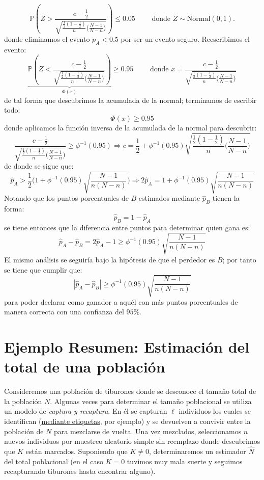 \documentclass[
]{book}
\begin{document}
\[
\mathbb{P}\left( Z > \dfrac{c - \frac{1}{2}}{\sqrt{\frac{\frac{1}{2}(1-\frac{1}{2})}{n}\Big( \frac{N-1}{N-n}\Big)}} \right) \leq 0.05 \qquad \text{ donde } Z \sim \text{Normal}(0,1).
\]
donde eliminamos el evento \(p_A < 0.5\) por ser un evento seguro. Reescribimos el evento:
\[
\underbrace{\mathbb{P}\left( Z < \dfrac{c - \frac{1}{2}}{\sqrt{\frac{\frac{1}{2}(1-\frac{1}{2})}{n}\Big( \frac{N-1}{N-n}\Big)}} \right)}_{\Phi(x)} \geq 0.95 \qquad \text{ donde } x = \dfrac{c - \frac{1}{2}}{\sqrt{\frac{\frac{1}{2}(1-\frac{1}{2})}{n}\Big( \frac{N-1}{N-n}\Big)}}
\]
de tal forma que descubrimos la acumulada de la normal; terminamos de escribir todo:
\[
\Phi(x) \geq 0.95
\]
donde aplicamos la función inversa de la acumulada de la normal para descubrir:
\[
\dfrac{c - \frac{1}{2}}{\sqrt{\frac{\frac{1}{2}(1-\frac{1}{2})}{n}\Big( \frac{N-1}{N-n}\Big)}} \geq \phi^{-1}(0.95) \Rightarrow c = \frac{1}{2} + \phi^{-1}(0.95)\sqrt{\frac{\frac{1}{2}(1-\frac{1}{2})}{n}\Big( \frac{N-1}{N-n}\Big)}
\]
de donde se sigue que:
\[
\hat{p}_{A} > \frac{1}{2}\Bigg(1 + \phi^{-1}(0.95)\sqrt{\frac{N-1}{n(N-n)}} \Bigg) \Rightarrow 2\hat{p}_A = 1 + \phi^{-1}(0.95)\sqrt{\frac{N-1}{n(N-n)}} 
\]
Notando que los puntos porcentuales de \(B\) estimados mediante \(\hat{p}_B\) tienen la forma:
\[
\hat{p}_B = 1 - \hat{p}_A
\]
se tiene entonces que la diferencia entre puntos para determinar quien gana es:
\[
\hat{p}_A - \hat{p}_B = 2\hat{p}_A - 1 \geq \phi^{-1}(0.95)\sqrt{\frac{N-1}{n(N-n)}} 
\]
El mismo análisis se seguiría bajo la hipótesis de que el perdedor es \(B\); por tanto se tiene que cumplir que:
\[
| \hat{p}_A - \hat{p}_B | \geq \phi^{-1}(0.95)\sqrt{\frac{N-1}{n(N-n)}} 
\]
para poder declarar como ganador a aquél con más puntos porcentuales de manera correcta con una confianza del \(95\%\).

\hypertarget{ejemplo-resumen-estimaciuxf3n-del-total-de-una-poblaciuxf3n}{%
\section{Ejemplo Resumen: Estimación del total de una población}\label{ejemplo-resumen-estimaciuxf3n-del-total-de-una-poblaciuxf3n}}

Consideremos una población de tiburones donde se desconoce el tamaño total de la población \(N\). Algunas veces para determinar el tamaño poblacional se utiliza un modelo de \emph{captura y recaptura}. En él se capturan \(\ell\) individuos los cuales se identifican (\href{http://www.fao.org/tempref/docrep/fao/008/a0212e/a0212E04.pdf}{mediante etiquetas}, por ejemplo) y se devuelven a convivir entre la población de \(N\) para mezclarse de vuelta. Una vez mezclados, seleccionamos \(n\) nuevos individuos por muestreo aleatorio simple sin reemplazo donde descubrimos que \(K\) están marcados. Suponiendo que \(K \neq 0\), determinaremos un estimador \(\hat{N}\) del total poblacional (en el caso \(K = 0\) tuvimos muy mala suerte y seguimos recapturando tiburones hasta encontrar alguno).
\end{document}
